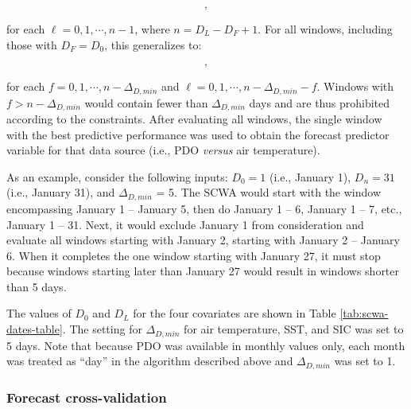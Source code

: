 \documentclass[12pt,]{book}
\theoremstyle{definition}
\theoremstyle{definition}
\theoremstyle{definition}
\theoremstyle{remark}
\begin{document}
\begin{equation}
  [D_0, D_0 + \Delta_{D,min} - 1 + \ell],
\label{eq:scwa-1}
\end{equation}

\noindent
for each \(\ell = 0, 1, \cdots, n - 1\), where \(n = D_L - D_F + 1\).
For all windows, including those with \(D_F = D_0\), this generalizes
to:

\begin{equation}
  [D_0 + f, D_0 + f + \Delta_{D,min} - 1 + \ell],
\label{eq:scwa-2}
\end{equation}

\noindent
for each \(f = 0, 1, \cdots, n - \Delta_{D,min}\) and
\(\ell = 0, 1, \cdots, n - \Delta_{D,min} - f\). Windows with
\(f > n - \Delta_{D,min}\) would contain fewer than \(\Delta_{D,min}\)
days and are thus prohibited according to the constraints. After
evaluating all windows, the single window with the best predictive
performance was used to obtain the forecast predictor variable for that
data source (i.e., PDO \emph{versus} air temperature).

As an example, consider the following inputs: \(D_0 = 1\) (i.e., January
1), \(D_n = 31\) (i.e., January 31), and \(\Delta_{D,min}\) = 5. The
SCWA would start with the window encompassing January 1 -- January 5,
then do January 1 -- 6, January 1 -- 7, etc., January 1 -- 31. Next, it
would exclude January 1 from consideration and evaluate all windows
starting with January 2, starting with January 2 -- January 6. When it
completes the one window starting with January 27, it must stop because
windows starting later than January 27 would result in windows shorter
than 5 days.

The values of \(D_0\) and \(D_L\) for the four covariates are shown in
Table \ref{tab:scwa-dates-table}. The setting for \(\Delta_{D,min}\) for
air temperature, SST, and SIC was set to 5 days. Note that because PDO
was available in monthly values only, each month was treated as ``day''
in the algorithm described above and \(\Delta_{D,min}\) was set to 1.

\subsubsection{Forecast cross-validation}\label{fcst-cv}
\end{document}
